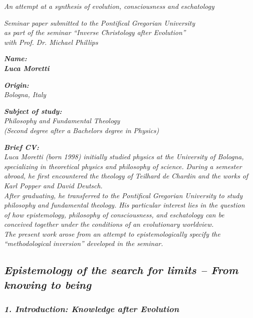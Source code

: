 \documentclass[
]{article}
\begin{document}
\emph{An attempt at a synthesis of evolution, consciousness and eschatology}

\emph{Seminar paper submitted to the Pontifical Gregorian University\\
as part of the seminar ``Inverse Christology after Evolution''\\
with Prof. Dr. Michael Phillips}

\emph{\textbf{Name:\\
Luca Moretti}}

\emph{\textbf{Origin:\\
}Bologna, Italy}

\emph{\textbf{Subject of study:\\
}Philosophy and Fundamental Theology\\
(Second degree after a Bachelor\textquotesingle s degree in Physics)}

\emph{\textbf{Brief CV:\\
}Luca Moretti (born 1998) initially studied physics at the University of Bologna, specializing in theoretical physics and philosophy of science. During a semester abroad, he first encountered the theology of Teilhard de Chardin and the works of Karl Popper and David Deutsch.\\
After graduating, he transferred to the Pontifical Gregorian University to study philosophy and fundamental theology. His particular interest lies in the question of how epistemology, philosophy of consciousness, and eschatology can be conceived together under the conditions of an evolutionary worldview.\\
The present work arose from an attempt to epistemologically specify the ``methodological inversion'' developed in the seminar.}

\subsection{\texorpdfstring{\emph{\textbf{Epistemology of the search for limits -- From knowing to being}}}{Epistemology of the search for limits -- From knowing to being}}\label{epistemology-of-the-search-for-limits-from-knowing-to-being}

\subsubsection{\texorpdfstring{\emph{\textbf{1. Introduction: Knowledge after Evolution}}}{1. Introduction: Knowledge after Evolution}}\label{introduction-knowledge-after-evolution}
\end{document}
